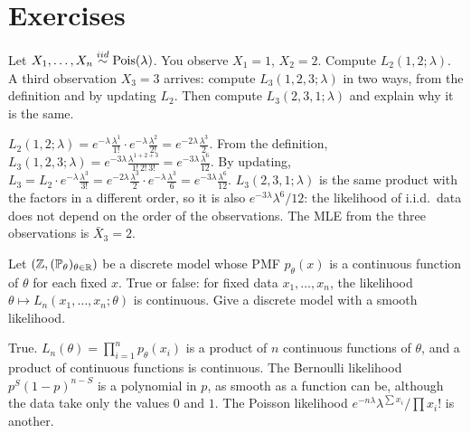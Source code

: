 \section{Exercises}
\label{sec:lik-exercises}

\begin{exercise}
\label{ex:lik-poisson-update}
Let $X_1, \ldots, X_n \stackrel{iid}{\sim} \text{Pois}(\lambda)$. You observe $X_1 = 1$, $X_2 = 2$. Compute $L_2(1, 2; \lambda)$. A third observation $X_3 = 3$ arrives: compute $L_3(1, 2, 3; \lambda)$ in two ways, from the definition and by updating $L_2$. Then compute $L_3(2, 3, 1; \lambda)$ and explain why it is the same.
\end{exercise}
\begin{solution}
$L_2(1, 2; \lambda) = e^{-\lambda}\frac{\lambda^1}{1!} \cdot e^{-\lambda}\frac{\lambda^2}{2!} = e^{-2\lambda}\frac{\lambda^3}{2}$. From the definition, $L_3(1, 2, 3; \lambda) = e^{-3\lambda}\frac{\lambda^{1+2+3}}{1!\,2!\,3!} = e^{-3\lambda}\frac{\lambda^6}{12}$. By updating, $L_3 = L_2 \cdot e^{-\lambda}\frac{\lambda^3}{3!} = e^{-2\lambda}\frac{\lambda^3}{2}\cdot e^{-\lambda}\frac{\lambda^3}{6} = e^{-3\lambda}\frac{\lambda^6}{12}$. $L_3(2, 3, 1; \lambda)$ is the same product with the factors in a different order, so it is also $e^{-3\lambda}\lambda^6/12$: the likelihood of i.i.d.\ data does not depend on the order of the observations. The MLE from the three observations is $\bar{X}_3 = 2$.
\end{solution}

\begin{exercise}
\label{ex:lik-continuity}
Let $(\mathbb{Z}, (\mathbb{P}_\theta)_{\theta \in \mathbb{R}})$ be a discrete model whose PMF $p_\theta(x)$ is a continuous function of $\theta$ for each fixed $x$. True or false: for fixed data $x_1, \ldots, x_n$, the likelihood $\theta \mapsto L_n(x_1, \ldots, x_n; \theta)$ is continuous. Give a discrete model with a smooth likelihood.
\end{exercise}
\begin{solution}
True. $L_n(\theta) = \prod_{i=1}^n p_\theta(x_i)$ is a product of $n$ continuous functions of $\theta$, and a product of continuous functions is continuous. The Bernoulli likelihood $p^{S}(1 - p)^{n - S}$ is a polynomial in $p$, as smooth as a function can be, although the data take only the values $0$ and $1$. The Poisson likelihood $e^{-n\lambda}\lambda^{\sum x_i}/\prod x_i!$ is another.
\end{solution}


